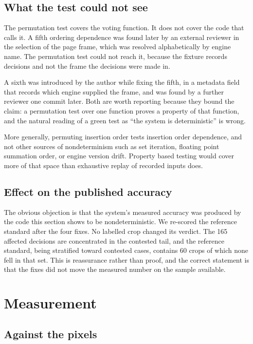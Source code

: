 \documentclass[11pt,a4paper]{article}
\begin{document}
\subsection{What the test could not see}

The permutation test covers the voting function. It does not cover the code that calls
it. A fifth ordering dependence was found later by an external reviewer in the selection
of the page frame, which was resolved alphabetically by engine name. The permutation test
could not reach it, because the fixture records decisions and not the frame the decisions
were made in.

A sixth was introduced by the author while fixing the fifth, in a metadata field that
records which engine supplied the frame, and was found by a further reviewer one commit
later. Both are worth reporting because they bound the claim: a permutation test over one
function proves a property of that function, and the natural reading of a green test as
``the system is deterministic'' is wrong.

More generally, permuting insertion order tests insertion order dependence, and not other
sources of nondeterminism such as set iteration, floating point summation order, or
engine version drift. Property based testing would cover more of that space than
exhaustive replay of recorded inputs does.

\subsection{Effect on the published accuracy}

The obvious objection is that the system's measured accuracy was produced by the code
this section shows to be nondeterministic. We re-scored the reference standard after the
four fixes. No labelled crop changed its verdict. The 165 affected decisions are
concentrated in the contested tail, and the reference standard, being stratified toward
contested cases, contains 60 crops of which none fell in that set. This is reassurance
rather than proof, and the correct statement is that the fixes did not move the measured
number on the sample available.

\section{Measurement}

\subsection{Against the pixels}
\end{document}
